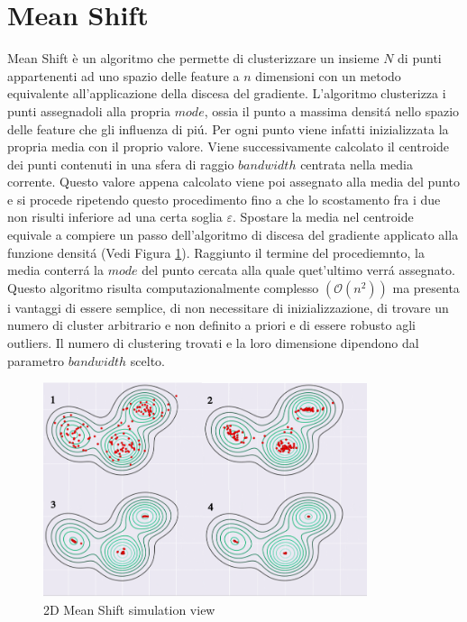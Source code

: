 \documentclass{article}
\begin{document}
\section{Mean Shift}
Mean Shift è un algoritmo che permette di clusterizzare un insieme $ N $ di punti appartenenti ad uno spazio delle feature a $ n $ dimensioni con un metodo equivalente all'applicazione della discesa del gradiente. L'algoritmo clusterizza i punti assegnadoli alla propria $ mode $, ossia il punto a massima densit\'a nello spazio delle feature che gli influenza di pi\'u. Per ogni punto viene infatti inizializzata la propria media con il proprio valore. Viene successivamente calcolato il centroide dei punti contenuti in una sfera di raggio $bandwidth$ centrata nella media corrente. Questo valore appena calcolato viene poi assegnato alla media del punto e si procede ripetendo questo procedimento fino a che lo scostamento fra i due non risulti inferiore ad una certa soglia $\varepsilon$. Spostare la media nel centroide equivale a compiere un passo dell'algoritmo di discesa del gradiente applicato alla funzione densit\'a (Vedi Figura \ref{2D_Mean_Shift_simualtion_view}). Raggiunto il termine del procediemnto, la media conterr\'a la $mode$ del punto cercata alla quale quet'ultimo verr\'a assegnato. Questo algoritmo risulta computazionalmente complesso $(\mathcal{O}(n^{2}))$ ma presenta i vantaggi di essere semplice, di non necessitare di inizializzazione, di trovare un numero di cluster arbitrario e non definito a priori e di essere robusto agli outliers. Il numero di clustering trovati e la loro dimensione dipendono dal parametro $bandwidth$ scelto.    

\begin{figure}[!h]
\centering
\includegraphics[width= 9.5cm]{"Immagini/Simulation.PNG"}
\caption{2D Mean Shift simulation view}
\label{2D_Mean_Shift_simualtion_view}
\end{figure}
\end{document}
